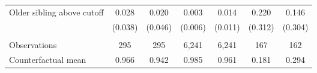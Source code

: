 {{\begin{tabular}{lcccccc}
Older sibling above cutoff&       0.028   &       0.020   &       0.003   &       0.014   &       0.220   &       0.146   \\
                    &     (0.038)   &     (0.046)   &     (0.006)   &     (0.011)   &     (0.312)   &     (0.304)   \\
                    &               &               &               &               &               &               \\
Observations        &         295   &         295   &       6,241   &       6,241   &         167   &         162   \\
Counterfactual mean &       0.966   &       0.942   &       0.985   &       0.961   &       0.181   &       0.294   \\
 

\bottomrule
\end{tabular}
}
}
